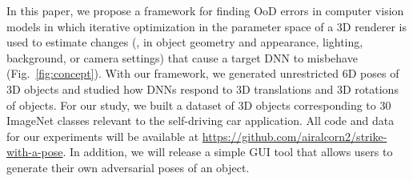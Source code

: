 \documentclass[10pt,twocolumn,letterpaper]{article}
\newcommand{\x}{\mathbf{x}}
\begin{document}






In this paper, we propose a framework for finding OoD errors in computer vision models in which iterative optimization in the parameter space of a 3D renderer is used to estimate changes (\eg, in object geometry and appearance, lighting, background, or camera settings) that cause a target DNN to misbehave (Fig.~\ref{fig:concept}).
With our framework, we generated unrestricted 6D poses of 3D objects and studied how DNNs respond to 3D translations and 3D rotations of objects.
For our study, we built a dataset of 3D objects corresponding to 30 ImageNet classes relevant to the self-driving car application.
All code and data for our experiments will be available at 
\url{https://github.com/airalcorn2/strike-with-a-pose}.
In addition, we will release a simple GUI tool that allows users to generate their own adversarial poses of an object.
\end{document}
